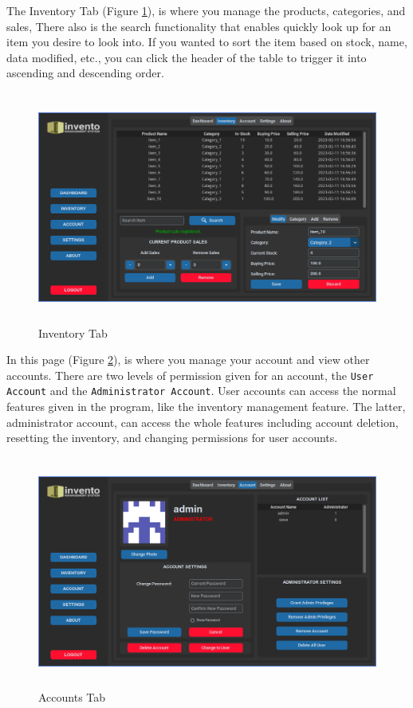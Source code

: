 \documentclass[12pt,a4paper]{article}
\begin{document}
        The Inventory Tab (Figure \ref{fig:inventory}), is where you manage the
        products, categories, and sales, There also is the search functionality that
        enables quickly look up for an item you desire to look into. If you wanted to
        sort the item based on stock, name, data modified, etc., you can click the
        header of the table to trigger it into ascending and descending order.

        \begin{figure}[ht]
          \centering
          \includegraphics[width=5in,height=3in]{Inventory.png}
          \caption{Inventory Tab}
          \label{fig:inventory}
        \end{figure}

    \newpage

        In this page (Figure \ref{fig:account}), is where you manage your account
        and view other accounts. There are two levels of permission given for an
        account, the \texttt{User Account} and the \texttt{Administrator Account}.
        User accounts can access the normal features given in the program, 
        like the inventory management feature. The latter, administrator account, 
        can access the whole features including account deletion, resetting the
        inventory, and changing permissions for user accounts.

        \begin{figure}[ht]
          \centering
          \includegraphics[width=5in,height=3in]{Account.png}
          \caption{Accounts Tab}
          \label{fig:account}
        \end{figure}
\end{document}
